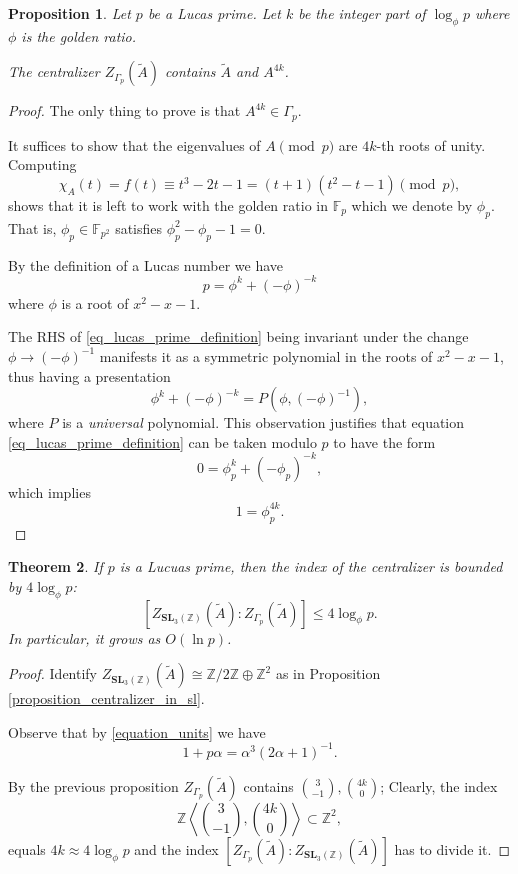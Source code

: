 \documentclass[a4paper]{article}
\newtheorem{Thm}{Theorem}[section]
\newtheorem{Prop}[Thm]{Proposition}
\newcommand{\SL}{\mathbf{SL}_3(\mathbb{Z})}        %
\newcommand{\SLp}{\Gamma_p}        %
\newcommand{\phip}{\phi_p}        %
\begin{document}
\begin{Prop}\label{prop:lucas}
Let $p$ be a Lucas prime.
Let $k$ be the integer part of $\log_{\phi} p$ where $\phi$ is the golden ratio.

The centralizer $Z_{\SLp}(\tilde A)$ contains $\tilde A$ and $A^{4k}$.
\end{Prop}
\begin{proof}
The only thing to prove is that 
$A^{4k}  \in \SLp$.

It suffices to show that the eigenvalues of $A \pmod p$ are $4k$-th roots of unity.
Computing
\[
\chi_{A}(t) = f(t) \equiv t^3 - 2 t - 1 = (t + 1) (t^2 - t - 1) \pmod p
,\] 
shows that it is left to work with the golden ratio in $\mathbb F_p$ which we denote by $\phip$.
That is, $\phip \in \mathbb F_{p^2}$ satisfies $\phip^2 - \phip - 1 = 0$.


By the definition of a Lucas number we have 
\begin{equation}
	\label{eq_lucas_prime_definition}
p = \phi^k + (-\phi)^{-k} 
\end{equation}
where $\phi$ is a root of $x^2 - x - 1$.

The RHS of \eqref{eq_lucas_prime_definition} being invariant under the change $\phi \to (-\phi)^{-1}$ manifests it as a symmetric polynomial in the roots of $x^2 - x - 1$, thus having a presentation
\[
\phi^k + (-\phi)^{-k} = P( \phi, (-\phi)^{-1})
,\] 
where $P$ is a \emph{universal} polynomial.
This observation justifies that equation \eqref{eq_lucas_prime_definition} can be taken modulo $p$ to have the form
\[
0 = \phip^k + (-\phip)^{-k} 
,\] 
which implies 
\[
1 = \phip^{4k} 
.\] 
\end{proof}

\begin{Thm}
	If $p$ is a Lucuas prime, then the index of the centralizer is bounded by $4 \log_{\phi} p$:
\[
	[Z_{\SL}(\tilde A) : Z_{\SLp}(\tilde A)] \le 4 \log_{\phi} p
.\] 
In particular, it grows as $O(\ln p)$.
\end{Thm}
\begin{proof}
Identify $Z_{\SL}(\tilde A) \cong \mathbb{Z}/2\mathbb{Z} \oplus \mathbb{Z}^2$ as in Proposition \ref{proposition_centralizer_in_sl}.

Observe that by \eqref{equation_units} we have
\[
1 + p \alpha = \alpha^3 (2 \alpha + 1)^{-1} 
.\] 

By the previous proposition 
$Z_{\SLp}(\tilde A)$ contains $\binom{3}{-1}, \binom{4k}{0}$;
Clearly, the index
\[
\mathbb{Z} \left< \binom{3}{-1}, \binom{4k}{0}\right> \subset \mathbb{Z}^2
,\] 
equals $4k \approx 4 \log_{\phi} p$ and the index 
$ [Z_{\SLp}(\tilde A) : Z_{\SL}(\tilde A)]$
has to divide it.
\end{proof}
\end{document}
